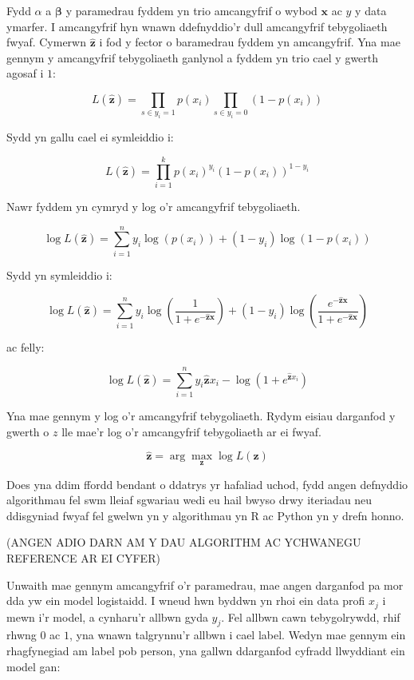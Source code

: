 Fydd $\alpha$ a $\mathbf{\beta}$ y paramedrau fyddem yn trio amcangyfrif o wybod $\mathbf{x}$ ac $y$ y data ymarfer. I amcangyfrif hyn wnawn ddefnyddio'r dull amcangyfrif tebygoliaeth fwyaf. Cymerwn $\hat{\mathbf{z}}$ i fod y fector o baramedrau fyddem yn amcangyfrif. Yna mae gennym y amcangyfrif tebygoliaeth ganlynol a fyddem yn trio cael y gwerth agosaf i $1$:

$$ L(\hat{\mathbf{z}}) = \prod_{s \in y_{i}=1} p(x_i) \prod_{s \in y_{i}=0} (1 - p(x_i))$$ %

Sydd yn gallu cael ei symleiddio i:

$$ L(\hat{\mathbf{z}}) = \prod_{i=1}^{k} p(x_i)^{y_i} (1 - p(x_i))^{1-y_i} $$

Nawr fyddem yn cymryd y log o'r amcangyfrif tebygoliaeth.

$$ \log L(\hat{\mathbf{z}}) = \sum_{i=1}^{n} y_{i} \log(p(x_{i})) + (1-y_{i}) \log(1-p(x_{i})) $$

Sydd yn symleiddio i:

$$ \log L(\hat{\mathbf{z}}) = \sum_{i=1}^{n} y_{i} \log \left(\frac{1}{1 + e^{-\hat{\mathbf{z}}\mathbf{x}}} \right) + (1 - y_i) \log \left(\frac{e^{-\hat{\mathbf{z}}\mathbf{x}}}{1 + e^{-\hat{\mathbf{z}}\mathbf{x}}} \right) $$

ac felly:

$$ \log L(\hat{\mathbf{z}}) = \sum_{i=1}^{n} y_i \hat{\mathbf{z}} x_i - \log(1 + e^{\hat{\mathbf{z}} x_i}) $$

Yna mae gennym y log o'r amcangyfrif tebygoliaeth. Rydym eisiau darganfod y gwerth o $z$ lle mae'r log o'r amcangyfrif tebygoliaeth ar ei fwyaf.

$$ \hat{\mathbf{z}} = \arg \max_{\mathbf{z}} \log L(\mathbf{z})  $$

Does yna ddim ffordd bendant o ddatrys yr hafaliad uchod, fydd angen defnyddio algorithmau fel swm lleiaf sgwariau wedi eu hail bwyso drwy iteriadau neu ddisgyniad fwyaf fel gwelwn yn y algorithmau yn R ac Python yn y drefn honno. 

(ANGEN ADIO DARN AM Y DAU ALGORITHM AC YCHWANEGU REFERENCE AR EI CYFER)

Unwaith mae gennym amcangyfrif o'r paramedrau, mae angen darganfod pa mor dda yw ein model logistaidd. I wneud hwn byddwn yn rhoi ein data profi $x_j$ i mewn i'r model, a cynharu'r allbwn gyda $y_j$. Fel allbwn cawn tebygolrywdd, rhif rhwng $0$ ac $1$, yna wnawn talgrynnu'r allbwn i cael label. Wedyn mae gennym ein rhagfynegiad am label pob person, yna gallwn ddarganfod cyfradd llwyddiant ein model gan:

